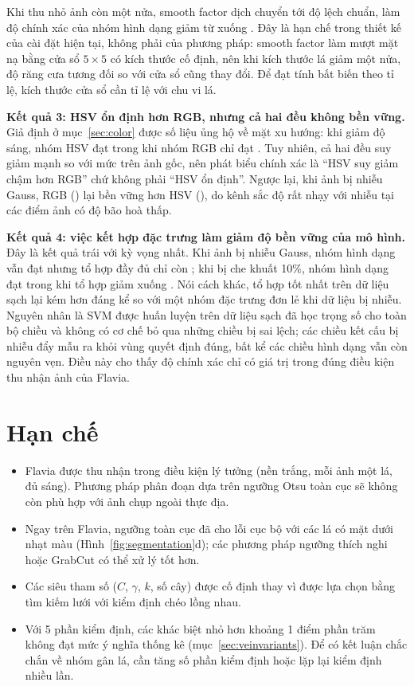 \documentclass[11pt,a4paper]{article}
\begin{document}
Khi thu nhỏ ảnh còn một nửa, smooth factor dịch chuyển tới \driftsmoothscale{} độ lệch chuẩn, làm độ
chính xác của nhóm hình dạng giảm từ \invshapeid{} xuống \invshapescale{}. Đây là hạn chế trong thiết
kế của cài đặt hiện tại, không phải của phương pháp: smooth factor làm mượt mặt nạ bằng cửa sổ
$5\times5$ có kích thước cố định, nên khi kích thước lá giảm một nửa, độ răng cưa tương đối so với
cửa sổ cũng thay đổi. Để đạt tính bất biến theo tỉ lệ, kích thước cửa sổ cần tỉ lệ với chu vi lá.

\textbf{Kết quả 3: HSV ổn định hơn RGB, nhưng cả hai đều không bền vững.} Giả định ở
mục~\ref{sec:color} được số liệu ủng hộ về mặt xu hướng: khi giảm độ sáng, nhóm HSV đạt \invhsvdark{}
trong khi nhóm RGB chỉ đạt \invrgbdark{}. Tuy nhiên, cả hai đều suy giảm mạnh so với mức \invhsvid{}
trên ảnh gốc, nên phát biểu chính xác là ``HSV suy giảm chậm hơn RGB'' chứ không phải ``HSV ổn định''.
Ngược lại, khi ảnh bị nhiễu Gauss, RGB (\invrgbnoise{}) lại bền vững hơn HSV (\invhsvnoise{}), do kênh
sắc độ rất nhạy với nhiễu tại các điểm ảnh có độ bão hoà thấp.

\textbf{Kết quả 4: việc kết hợp đặc trưng làm giảm độ bền vững của mô hình.} Đây là kết quả trái với
kỳ vọng nhất. Khi ảnh bị nhiễu Gauss, nhóm hình dạng vẫn đạt \invshapenoise{} nhưng tổ hợp đầy đủ chỉ
còn \invcombonoise{}; khi bị che khuất 10\%, nhóm hình dạng đạt \invshapeoccl{} trong khi tổ hợp giảm
xuống \invcombooccl{}. Nói cách khác, tổ hợp tốt nhất trên dữ liệu sạch lại kém hơn đáng kể so với một
nhóm đặc trưng đơn lẻ khi dữ liệu bị nhiễu. Nguyên nhân là SVM được huấn luyện trên dữ liệu sạch đã
học trọng số cho toàn bộ \bestdims{} chiều và không có cơ chế bỏ qua những chiều bị sai lệch; các
chiều kết cấu bị nhiễu đẩy mẫu ra khỏi vùng quyết định đúng, bất kể các chiều hình dạng vẫn còn
nguyên vẹn. Điều này cho thấy độ chính xác \bestacc{} chỉ có giá trị trong đúng điều kiện thu nhận
ảnh của Flavia.

\section{Hạn chế}

\begin{itemize}
  \item Flavia được thu nhận trong điều kiện lý tưởng (nền trắng, mỗi ảnh một lá, đủ sáng). Phương pháp
        phân đoạn dựa trên ngưỡng Otsu toàn cục sẽ không còn phù hợp với ảnh chụp ngoài thực địa.
  \item Ngay trên Flavia, ngưỡng toàn cục đã cho lỗi cục bộ với các lá có mặt dưới nhạt màu
        (Hình~\ref{fig:segmentation}d); các phương pháp ngưỡng thích nghi hoặc GrabCut có thể xử lý
        tốt hơn.
  \item Các siêu tham số ($C$, $\gamma$, $k$, số cây) được cố định thay vì được lựa chọn bằng tìm kiếm
        lưới với kiểm định chéo lồng nhau.
  \item Với 5 phần kiểm định, các khác biệt nhỏ hơn khoảng 1 điểm phần trăm không đạt mức ý nghĩa
        thống kê (mục~\ref{sec:veinvariants}). Để có kết luận chắc chắn về nhóm gân lá, cần tăng số
        phần kiểm định hoặc lặp lại kiểm định nhiều lần.
\end{itemize}
\end{document}
